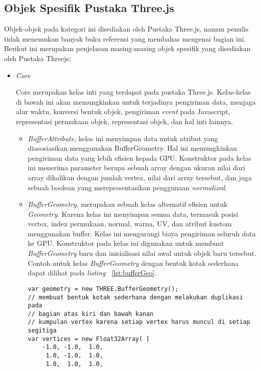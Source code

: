 \subsection{Objek Spesifik Pustaka Three.js}
\label{sec:objekspesifik}
Objek-objek pada kategori ini disediakan oleh Pustaka Three.js, namun penulis tidak menemukan banyak buku referensi yang membahas mengenai bagian ini. Berikut ini merupakan penjelasan masing-masing objek spesifik yang disediakan oleh Pustaka Threejs:

\begin{itemize}

	\item \textit{Core}
	
	Core merupakan kelas inti yang terdapat pada pustaka Three.js. Kelas-kelas di bawah ini akan memungkinkan untuk terjadinya pengiriman data, menjaga alur waktu, konversi bentuk objek, pengiriman {\it event} pada Javascript, representasi permukaan objek, representasi objek, dan hal inti lainnya.
	
	\begin{itemize}
		\item{\it BufferAttribute}, kelas ini menyimpan data untuk atribut yang diasosiasikan menggunakan BufferGeometry. Hal ini memungkinkan pengiriman data yang lebih efisien kepada GPU. Konstruktor pada kelas ini menerima parameter berupa sebuah array dengan ukuran nilai dari array dikalikan dengan jumlah vertex, nilai dari array tersebut, dan juga sebuah boolean yang merepresentasikan penggunaan {\it normalized}.
		\item{\it BufferGeometry}, merupakan sebuah kelas alternatif efisien untuk {\it Geometry}. Karena kelas ini menyimpan semua data, termasuk posisi vertex, index permukaan, normal, warna, UV, dan atribut kustom menggunakan buffer. Kelas ini mengurangi biaya pengiriman seluruh data ke GPU. Konstruktor pada kelas ini digunakan untuk membuat {\it BufferGeometry} baru dan inisialisasi nilai awal untuk objek baru tersebut. Contoh untuk kelas {\it BufferGeometry} dengan bentuk kotak sederhana dapat dilihat pada {\it listing} ~\ref{lst:bufferGeo}.
\begin{lstlisting}[caption={Contoh instansiasi kelas {\it BufferGeometry} dengan membuat bentuk kotak sederhana.}, label={lst:bufferGeo},captionpos=b]
var geometry = new THREE.BufferGeometry();
// membuat bentuk kotak sederhana dengan melakukan duplikasi pada
// bagian atas kiri dan bawah kanan
// kumpulan vertex karena setiap vertex harus muncul di setiap segitiga
var vertices = new Float32Array( [
	-1.0, -1.0,  1.0,
	 1.0, -1.0,  1.0,
	 1.0,  1.0,  1.0,


\end{lstlisting}
\end{itemize}
\end{itemize}
